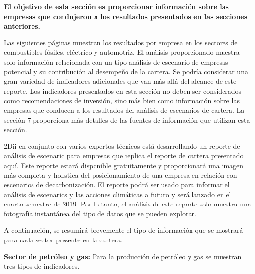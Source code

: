 \documentclass[10pt,table]{article}\usepackage[]{graphicx}\usepackage[]{color}
\begin{document}
	\begin{multicols}{2}
		
		\textbf{El objetivo de esta sección es proporcionar información sobre las empresas que condujeron a los resultados presentados en las secciones anteriores.}
		
	Las siguientes páginas muestran los resultados por empresa en los sectores de combustibles fósiles, eléctrico y automotriz. El análisis proporcionado muestra solo información relacionada con un tipo análisis de escenario de empresas potencial y su contribución al desempeño de la cartera. Se podría considerar una gran variedad de indicadores adicionales que van más allá del alcance de este reporte. Los indicadores presentados en esta sección no deben ser considerados como recomendaciones de inversión, sino más bien como información sobre las empresas que conducen a los resultados del análisis de escenarios de cartera. La sección 7 proporciona más detalles de las fuentes de información que utilizan esta sección.
		
		2Dii en conjunto con varios expertos técnicos está desarrollando un reporte de análisis de escenario para empresas que replica el reporte de cartera presentado aquí. Este reporte estará disponible gratuitamente y proporcionará una imagen más completa y holística del posicionamiento de una empresa en relación con escenarios de decarbonización. El reporte podrá ser usado para informar el análisis de escenarios y las acciones climáticas a futuro y será lanzado en el cuarto semestre de 2019. Por lo tanto, el análisis de este reporte solo muestra una fotografía instantánea del tipo de datos que se pueden explorar.
		
	A continuación, se resumirá brevemente el tipo de información que se mostrará para cada sector presente en la cartera. 
		
		\textbf{Sector de petróleo y gas: }Para la producción de petróleo y gas se muestran tres tipos de indicadores.
		

\end{multicols}
\end{document}
